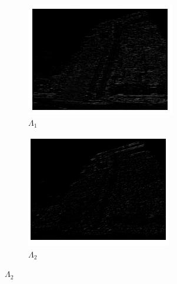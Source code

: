 \documentclass[letterpaper, 10 pt, conference]{ieeeconf}  %
\begin{document}
\begin{figure}[H]
\centering
    \begin{subfigure}{0.45\linewidth}
\includegraphics[width=\linewidth, scale=0.05]{images/stroke_0.png} 
    \caption{$\Lambda_{1}$}
\label{fig:1a}
    \end{subfigure}\hfill
    \begin{subfigure}{0.45\linewidth}
\includegraphics[width=\linewidth, scale=0.1]{images/stroke_1.png}
    \caption{$\Lambda_{2}$}
\label{fig:1a}
    \end{subfigure}


\end{figure}
\end{document}
